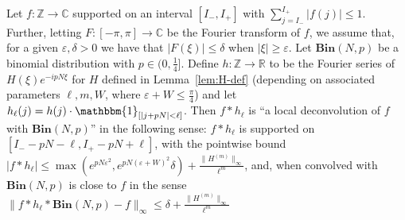 \documentclass[11pt]{article}
\theoremstyle{plain}
\newcommand{\Bin}[2]{\textbf{Bin}(#1,#2)}
\newcommand{\eps}{\varepsilon}
\begin{document}
\begin{lemma}\label{lem:deconvolution}
Let $f:\mathbb{Z}\rightarrow\mathbb{C}$ supported on an interval $[I_-,I_+]$ with $\sum_{j=I_-}^{I_+} |f(j)| \leq 1$. Further, letting $F:[-\pi,\pi]\rightarrow\mathbb{C}$ be the Fourier transform of $f$, we assume that, for a given $\eps,\delta>0$ we have that $|F(\xi)|\leq\delta$ when $|\xi|\geq \eps$. Let $\Bin{N}{p}$ be a binomial distribution with $p\in (0,\frac{1}{4}]$. Define $h:\mathbb{Z}\rightarrow\mathbb{R}$ to be the Fourier series of $H(\xi)e^{-ipN\xi}$ for $H$ defined in Lemma~\ref{lem:H-def} (depending on associated parameters $\ell,m,W$, where $\eps+W\leq\frac{\pi}{4}$) and let $h_\ell(j)=h(j)\cdot\mathbbm{1}_{[|j+pN|< \ell]}$. Then $f\ast h_\ell$ is ``a local deconvolution of $f$ with $\Bin{N}{p}$'' in the following sense: $f\ast h_\ell$ is supported on $[I_--pN-\ell,I_+-pN+\ell]$, with the pointwise bound $|f\ast h_\ell|\leq  \max(e^{pN\eps^2}, e^{pN(\eps+W)^2}\delta)+\frac{ \|H^{(m)}\|_{\infty}}{\ell^m}$, and, when convolved with $\Bin{N}{p}$ is close to $f$ in the sense $\|f\ast h_\ell\ast \Bin{N}{p}-f\|_\infty\leq \delta+\frac{\|H^{(m)}\|_{\infty}}{\ell^m}$
\end{lemma}
\end{document}
